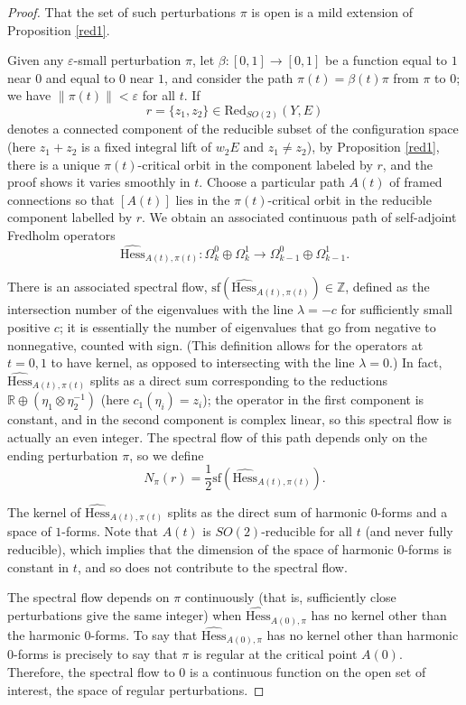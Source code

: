 \documentclass{memo-l}
\theoremstyle{definition}
\theoremstyle{remark}
\numberwithin{section}{chapter}
\numberwithin{equation}{chapter}
\begin{document}
\begin{proof}That the set of such perturbations $\pi$ is open is a mild extension of Proposition \ref{red1}.

Given any $\varepsilon$-small perturbation $\pi$, let $\beta: [0,1] \to [0,1]$ be a function equal to $1$ near $0$ and equal to $0$ near $1$, and consider the path $\pi(t) = \beta(t) \pi$ from $\pi$ to $0$; we have $\|\pi(t)\| < \varepsilon$ for all $t$. If 
$$r = \{z_1, z_2\} \in \text{Red}_{SO(2)}(Y,E)$$ 
denotes a connected component of the reducible subset of the configuration space (here $z_1 + z_2$ is a fixed integral lift of $w_2 E$ and $z_1 \neq z_2$), by Proposition \ref{red1}, there is a unique $\pi(t)$-critical orbit in the component labeled by $r$, and the proof shows it varies smoothly in $t$. Choose a particular path $A(t)$ of framed connections so that $[A(t)]$ lies in the $\pi(t)$-critical orbit in the reducible component labelled by $r$. We obtain an associated continuous path of self-adjoint Fredholm operators $$\widehat{\text{Hess}}_{A(t),\pi(t)}: \Omega^0_k \oplus \Omega^1_k \to \Omega^0_{k-1} \oplus \Omega^1_{k-1}.$$

There is an associated spectral flow, $\text{sf}\left(\widehat{\text{Hess}}_{A(t),\pi(t)}\right) \in \mathbb Z$, defined as the intersection number of the eigenvalues with the line $\lambda = - c$ for sufficiently small positive $c$; it is essentially the number of eigenvalues that go from negative to nonnegative, counted with sign. (This definition allows for the operators at $t = 0,1$ to have kernel, as opposed to intersecting with the line $\lambda = 0$.) In fact, $\widehat{\text{Hess}}_{A(t),\pi(t)}$ splits as a direct sum corresponding to the reductions $\mathbb R \oplus (\eta_1 \otimes \eta_2^{-1})$ (here $c_1(\eta_i) = z_i$); the operator in the first component is constant, and in the second component is complex linear, so this spectral flow is actually an even integer. The spectral flow of this path depends only on the ending perturbation $\pi$, so we define 
$$N_\pi(r) = \frac{1}{2}\text{sf}\left(\widehat{\text{Hess}}_{A(t),\pi(t)}\right).$$ 

The kernel of $\widehat{\text{Hess}}_{A(t),\pi(t)}$ splits as the direct sum of harmonic $0$-forms and a space of $1$-forms. Note that $A(t)$ is $SO(2)$-reducible for all $t$ (and never fully reducible), which implies that the dimension of the space of harmonic $0$-forms is constant in $t$, and so does not contribute to the spectral flow.

The spectral flow depends on $\pi$ continuously (that is, sufficiently close perturbations give the same integer) when $\widehat{\text{Hess}}_{A(0),\pi}$ has no kernel other than the harmonic 0-forms. To say that $\widehat{\text{Hess}}_{A(0),\pi}$ has no kernel other than harmonic 0-forms is precisely to say that $\pi$ is regular at the critical point $A(0)$. Therefore, the spectral flow to $0$ is a continuous function on the open set of interest, the space of regular perturbations.


\end{proof}
\end{document}
